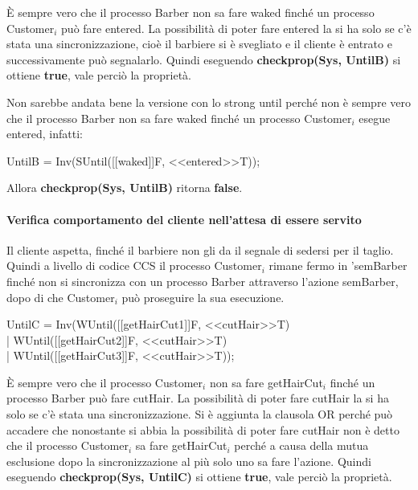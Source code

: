 È sempre vero che il processo \textsf{Barber} non sa fare \textsf{waked} finché un processo \textsf{Customer$_{i}$} può fare \textsf{entered}. La possibilità di poter fare \textsf{entered} la si ha solo se c'è stata una sincronizzazione, cioè il barbiere si è svegliato e il cliente è entrato e successivamente può segnalarlo. Quindi eseguendo \textbf{checkprop(Sys, UntilB)} si ottiene \textbf{true}, vale perciò la proprietà.

Non sarebbe andata bene la versione con lo strong until perché non è sempre vero che il processo \textsf{Barber} non sa fare \textsf{waked} finché un processo \textsf{Customer$_{i}$} esegue \textsf{entered}, infatti: 

\begin{center}
	 \textsf{UntilB = Inv(SUntil([[waked]]F, <<entered>>T));}
\end{center}

Allora \textbf{checkprop(Sys, UntilB)} ritorna \textbf{false}.
\pagebreak
\paragraph{Verifica comportamento del cliente nell'attesa di essere servito }\mbox{}

Il cliente aspetta, finché il barbiere non gli da il segnale di sedersi per il taglio. Quindi a livello di codice CCS il processo \textsf{Customer$_{i}$} rimane fermo in \textsf{'semBarber} finché non si sincronizza con un processo \textsf{Barber} attraverso l'azione \textsf{semBarber}, dopo di che \textsf{Customer$_{i}$} può proseguire la sua esecuzione.
\begin{center}
	\textsf{UntilC = Inv(WUntil([[getHairCut1]]F, <<cutHair>>T) \\| WUntil([[getHairCut2]]F, <<cutHair>>T) \\| WUntil([[getHairCut3]]F, <<cutHair>>T));}
\end{center}

È sempre vero che il processo \textsf{Customer$_{i}$} non sa fare \textsf{getHairCut$_{i}$} finché un processo \textsf{Barber} può fare \textsf{cutHair}. La possibilità di poter fare \textsf{cutHair} la si ha solo se c'è stata una sincronizzazione. Si è aggiunta la clausola OR perché può accadere che nonostante si abbia la possibilità di poter fare \textsf{cutHair} non è detto che il processo \textsf{Customer$_{i}$} sa fare \textsf{getHairCut$_{i}$} perché a causa della mutua esclusione dopo la sincronizzazione al più solo uno sa fare l'azione. Quindi eseguendo \textbf{checkprop(Sys, UntilC)} si ottiene \textbf{true}, vale perciò la proprietà.


